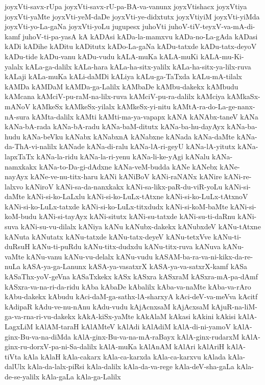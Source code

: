 {joyxVti-savx-rUpa
joyxVti-savx-rU-pa-BA-va-vanunx
joyxVtishacx
joyxVtiya
joyxVti-yaMte
joyxVti-yeM-daDe
joyxVti-ye-didxtutx
joyxVtiyiM
joyxVti-yiMda
joyxVti-yo-La-gaNa
joyxVti-yoLu
jugupesx
juhoVti
juhoV-tiV-teyxV-va-mA-di-kamf
juhoV-ti-pa-yasA
kA
kADAsi
kADa-la-mamxvu
kADa-no-La-gAda
kADasi
kADi
kADihe
kADitu
kADitutx
kADo-La-gaNa
kADu-tatxde
kADu-tatx-deyoV
kADu-tide
kADu-vanu
kADu-vudu
kALA-muKa
kALA-muKi
kALA-mu-Ki-yalalx
kALa-ga-dalilx
kALa-hara
kALa-ha-sitx-yalilx
kALa-ha-sitx-ya-lilx-ruva
kALaji
kALa-muKa
kALi-daMDi
kALiya
kALu-ga-TaTxda
kALu-mA-tilalx
kAMDa
kAMDaM
kAMDa-ga-Lalilx
kAMbaDe
kAMbu-dakekx
kAMbudu
kAMcana
kAMciV-pu-raM-na-lilx-ruva
kAMciV-pu-ra-dalilx
kAMciya
kAMkaSx-mANoV
kAMkeSx
kAMkeSx-yilalx
kAMkeSx-yi-nitu
kAMtA-ra-do-La-ge-nanx-nA-sura
kAMta-dalilx
kAMti
kAMti-ma-ya-vapapx
kANA
kANAbx-taneV
kANa
kANa-bA-rada
kANa-bA-radu
kANa-baM-ditutx
kANa-ba-hu-dayAyx
kANa-ba-hudu
kANa-beVku
kANabx
kANabxnA
kANabxne
kANada
kANa-daMte
kANa-da-ThA-vi-nalilx
kANade
kANa-di-ralu
kANa-lA-ri-geyU
kANa-lA-yitutx
kANa-lapxTaTx
kANa-la-ridu
kANa-la-ri-yenu
kANa-li-ke-yAgi
kANalu
kANa-namxkakx
kANa-to-Da-gi-dAdxne
kANa-veM-budda
kANe
kANebx
kANe-nayAyx
kANe-ve-nu-titx-haru
kANi
kANiBoV
kANi-raNANx
kANire
kANi-re-lalxvo
kANiroV
kANi-sa-da-nanxkakx
kANi-sa-likx-paR-du-viR-yoLu
kANi-si-daMte
kANi-si-ko-LaLxlu
kANi-si-ko-LuLx-tAtxne
kANi-si-ko-LuLx-tAtxnoV
kANi-si-ko-LuLx-tatxde
kANi-si-ko-LuLx-titxdudx
kANi-si-koM-baMte
kANi-si-koM-budu
kANi-si-tayAyx
kANi-situtx
kANi-su-tatxde
kANi-su-ti-daRnu
kANi-suva
kANi-su-vu-dilalx
kANiya
kANu
kANubx-dakekx
kANubxdeV
kANu-tAtxne
kANuta
kANutatx
kANu-tatxde
kANu-tatx-deyeV
kANu-tetxVve
kANu-ti-duRsuH
kANu-ti-puRdu
kANu-titx-dudxdu
kANu-titx-ruva
kANuva
kANu-vaMte
kANu-vanu
kANu-vu-delalx
kANu-vudu
kASAM-ba-ra-va-ni-kikx-da-re-nuLa
kASA-ya-ga-Lanunx
kASA-ya-vasatxrX
kASA-ya-va-satxrX-kamf
kASa
kASaThx-yoV-geVna
kASaTxkekx
kASx
kASxra
kASxraM
kASxra-mA-pa-dAmf
kASxra-va-na-ri-da-ridu
kAba
kAbaDe
kAbalilx
kAba-va-naMte
kAba-va-rAro
kAbu-dakekx
kAbudu
kAci-daM-ga-sathx-lA-sharxyA
kAci-deV-va-meVva
kAcitf
kAdipaR
kAdu-ve-nu-nAnu
kAdu-vudu
kAjAcnxsaM
kAjAcxsaM
kAjuR-na-liM-ga-va-rna-ri-vu-dakekx
kAkA-kiSx-yaMte
kAkAlaM
kAkasi
kAkini
kAkisi
kAlA-LagxLiM
kAlAM-taraH
kAlAMteV
kAlAdi
kAlAdiM
kAlA-di-ni-yamoV
kAlA-ginx-Bu-va-na-diMda
kAlA-ginx-Bu-va-na-mA-raBayx
kAlA-ginx-rudarxM
kAlA-ginx-ru-dorxV-pa-ni-Sa-dalilx
kAlA-muKa
kAlAnAM
kAlAri
kAlAriH
kAlA-tiVta
kAla
kAlaH
kAla-cakarx
kAla-ca-karxda
kAla-ca-karxvu
kAlada
kAla-dalUlx
kAla-da-lalx-piRsi
kAla-dalilx
kAla-da-va-rege
kAla-deV-sha-gaLa
kAla-de-se-yalilx
kAla-gaLa
kAla-ga-Lalilx
}
